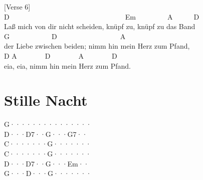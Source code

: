 \documentclass[
  letterpaper,
]{scrbook}
\begin{document}
{[}Verse 6{]}\\
\hspace*{0.333em}\hspace*{0.333em}\hspace*{0.333em}\hspace*{0.333em}\hspace*{0.333em}D~~~~~~~~~~~~~~~~~~~~~~~~~~~~~~~~~Em~~~~~~~~~A~~~~~~D\\
Laß mich von dir nicht scheiden, knüpf zu, knüpf zu das Band\\
\hspace*{0.333em}\hspace*{0.333em}\hspace*{0.333em}\hspace*{0.333em}\hspace*{0.333em}\hspace*{0.333em}\hspace*{0.333em}\hspace*{0.333em}\hspace*{0.333em}\hspace*{0.333em}\hspace*{0.333em}\hspace*{0.333em}\hspace*{0.333em}\hspace*{0.333em}\hspace*{0.333em}\hspace*{0.333em}\hspace*{0.333em}\hspace*{0.333em}\hspace*{0.333em}\hspace*{0.333em}G~~~~~~~~~~~~D~~~~~~~~~~~~~~~~~~A\\
der Liebe zwischen beiden; nimm hin mein Herz zum Pfand,\\
\hspace*{0.333em}\hspace*{0.333em}\hspace*{0.333em}\hspace*{0.333em}\hspace*{0.333em}D
A~~~~~~~~D~~~~~~~~A~~~~~~~~D\\
eia, eia, nimm hin mein Herz zum Pfand.

\hypertarget{stille-nacht}{%
\chapter{Stille Nacht}\label{stille-nacht}}

G···\textbar····\textbar····\textbar····\textbar{}\\
D···\textbar D7··\textbar G···\textbar G7··\textbar{}\\
C···\textbar····\textbar G···\textbar····\textbar{}\\
C···\textbar····\textbar G···\textbar····\textbar{}\\
D···\textbar D7··\textbar G···\textbar Em··\textbar{}\\
G···\textbar D···\textbar G···\textbar····\textbar{}
\end{document}

